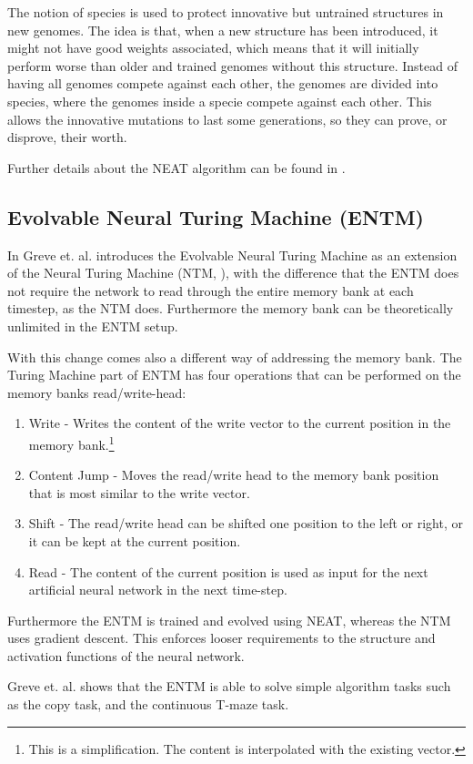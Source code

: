 \newpar The notion of species is used to protect innovative but untrained structures in new genomes. The idea is that, when a new structure has been introduced, it might not have good weights associated, which means that it will initially perform worse than older and trained genomes without this structure. Instead of having all genomes compete against each other, the genomes are divided into species, where the genomes inside a specie compete against each other. This allows the innovative mutations to last some generations, so they can prove, or disprove, their worth.

\newpar Further details about the NEAT algorithm can be found in \cite{stanley2002evolving}.

\subsection{Evolvable Neural Turing Machine (ENTM)}
In \cite{greve2016evolving} Greve et. al. introduces the Evolvable Neural Turing Machine as an extension of the Neural Turing Machine (NTM, \cite{graves2014neural}), with the difference that the ENTM does not require the network to read through the entire memory bank at each timestep, as the NTM does. Furthermore the memory bank can be theoretically unlimited in the ENTM setup.

\newpar With this change comes also a different way of addressing the memory bank. The Turing Machine part of ENTM has four operations that can be performed on the memory banks read/write-head:

\begin{enumerate}
	\item Write - Writes the content of the write vector to the current position in the memory bank.\footnote{This is a simplification. The content is interpolated with the existing vector.}
	\item Content Jump - Moves the read/write head to the memory bank position that is most similar to the write vector.
	\item Shift - The read/write head can be shifted one position to the left or right, or it can be kept at the current position.
	\item Read - The content of the current position is used as input for the next artificial neural network in the next time-step.
\end{enumerate}

\newpar Furthermore the ENTM is trained and evolved using NEAT, whereas the NTM uses gradient descent. This enforces looser requirements to the structure and activation functions of the neural network.

\newpar Greve et. al. shows that the ENTM is able to solve simple algorithm tasks such as the copy task, and the continuous T-maze task.
